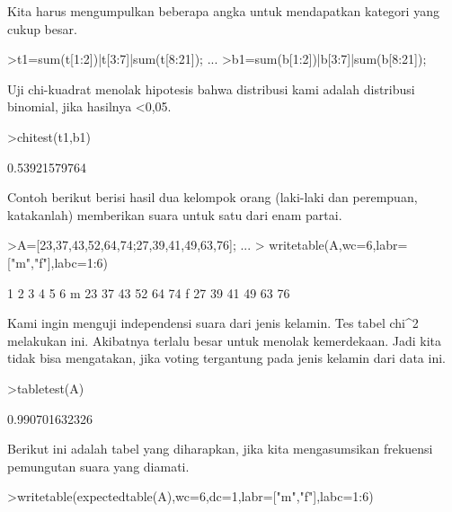 \documentclass{article}
\begin{document}
\begin{eulernotebook}
\begin{eulercomment}
\begin{eulercomment}
\begin{eulercomment}
Kita harus mengumpulkan beberapa angka untuk mendapatkan kategori yang
cukup besar.
\end{eulercomment}
\begin{eulerprompt}
>t1=sum(t[1:2])|t[3:7]|sum(t[8:21]); ...
>b1=sum(b[1:2])|b[3:7]|sum(b[8:21]);
\end{eulerprompt}
\begin{eulercomment}
Uji chi-kuadrat menolak hipotesis bahwa distribusi kami adalah
distribusi binomial, jika hasilnya \textless{}0,05.
\end{eulercomment}
\begin{eulerprompt}
>chitest(t1,b1)
\end{eulerprompt}
\begin{euleroutput}
  0.53921579764
\end{euleroutput}
\begin{eulercomment}
Contoh berikut berisi hasil dua kelompok orang (laki-laki dan
perempuan, katakanlah) memberikan suara untuk satu dari enam partai.
\end{eulercomment}
\begin{eulerprompt}
>A=[23,37,43,52,64,74;27,39,41,49,63,76];  ...
>  writetable(A,wc=6,labr=["m","f"],labc=1:6)
\end{eulerprompt}
\begin{euleroutput}
             1     2     3     4     5     6
       m    23    37    43    52    64    74
       f    27    39    41    49    63    76
\end{euleroutput}
\begin{eulercomment}
Kami ingin menguji independensi suara dari jenis kelamin. Tes tabel
chi\textasciicircum{}2 melakukan ini. Akibatnya terlalu besar untuk menolak
kemerdekaan. Jadi kita tidak bisa mengatakan, jika voting tergantung
pada jenis kelamin dari data ini.
\end{eulercomment}
\begin{eulerprompt}
>tabletest(A)
\end{eulerprompt}
\begin{euleroutput}
  0.990701632326
\end{euleroutput}
\begin{eulercomment}
Berikut ini adalah tabel yang diharapkan, jika kita mengasumsikan
frekuensi pemungutan suara yang diamati.
\end{eulercomment}
\begin{eulerprompt}
>writetable(expectedtable(A),wc=6,dc=1,labr=["m","f"],labc=1:6)
\end{eulerprompt}

\end{eulercomment}
\end{eulercomment}
\end{eulernotebook}
\end{document}
